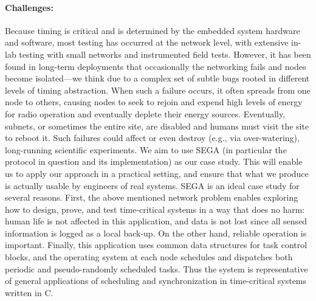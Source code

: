 \paragraph{Challenges:}

Because timing is critical and is determined by the embedded system hardware and software, most testing has occurred at the network level, with extensive in-lab testing with small networks and instrumented field tests.
However, it has been found in long-term deployments %
that occasionally the networking fails and nodes become isolated---we think due to a complex set of subtle bugs rooted in different levels of timing abstraction.
When such a failure occurs, it often spreads from one node to others, causing nodes to seek to rejoin and expend high levels of energy for radio operation and eventually deplete their energy sources.
Eventually, subnets, or sometimes the entire site, are disabled and humans must visit the site to reboot it.
Such failures could %
affect %
or even destroy (e.g., via over-watering), long-running scientific experiments.
%
We aim to use SEGA (in particular the protocol in question and its implementation) as our case study.
This will enable us to apply our approach in a practical setting, and ensure that what we produce is actually usable by engineers of real systems.
%
SEGA is an ideal case study for several reasons.
First, the above mentioned network problem enables exploring how to design, prove, and test time-critical systems in a way that does no harm: human life is not affected in this application, and data is not lost since all sensed information is logged as a local back-up.
On the other hand, reliable operation is important. %
Finally, this application uses common data structures for task control blocks, and the operating system at each node schedules and dispatches both periodic and pseudo-randomly scheduled tasks.
Thus the system is representative of %
general applications of scheduling and synchronization in time-critical systems written in C.



